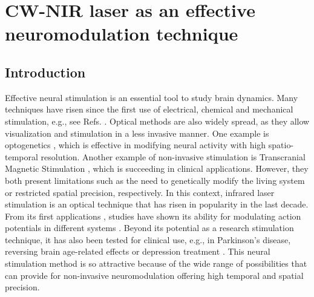 \chapter{CW-NIR laser as an effective neuromodulation technique}
\label{c-laser}

\section{Introduction}
\label{sect:intro}  %

Effective neural stimulation is an essential tool to study brain dynamics. Many techniques have risen since the first use of electrical, chemical and mechanical stimulation, e.g., see Refs. \parencite{cogan_neural_2008, chamorro_generalization_2012, carter_guide_2015, bickle_revolutions_2016}. Optical methods are also widely spread, as they allow visualization \parencite{lecoq_wide_2019} and stimulation in a less invasive manner. One example is optogenetics \parencite{boyden_millisecond-timescale_2005, yizhar_optogenetics_2011, tye_optogenetic_2012,bansal_towards_2022}, which is effective in modifying neural activity with high spatio-temporal resolution. Another example of non-invasive stimulation is Transcranial Magnetic Stimulation \parencite{valero-cabre_transcranial_2017}, which is succeeding in clinical applications. However, they both present limitations such as the need to genetically modify the living system or restricted spatial precision, respectively. In this context, infrared laser stimulation is an optical technique that has risen in popularity in the last decade. From its first applications \parencite{wells_application_2005, izzo_optical_2007}, studies have shown its ability for modulating action potentials in different systems \parencite{liang_temperature-dependent_2009, goyal_acute_2012, brown_thermal_2020, barrett_pulsed_2018, shapiro_infrared_2012, cayce_infrared_2014, begeng_activity_2022}. Beyond its potential as a research stimulation technique, it has also been tested for clinical use, e.g., in Parkinson's disease, reversing brain age-related effects or depression treatment \parencite{konstantinovic_transcranial_2013, disner_transcranial_2016, wang_impact_2017, saucedo_transcranial_2021, pan_infrared_2023}. This neural stimulation method is so attractive because of the wide range of possibilities that can provide for non-invasive neuromodulation offering high temporal and spatial precision.
	
